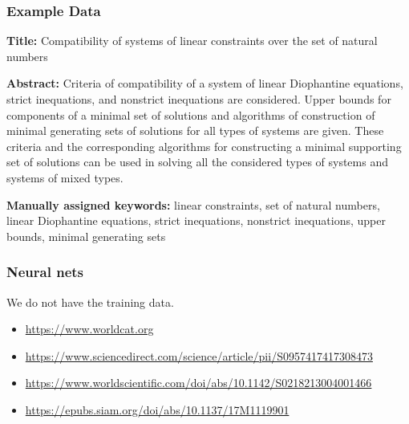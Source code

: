\documentclass{beamer}
\begin{document}
\begin{frame}
\frametitle{Example Data}
\textbf{Title:} Compatibility of systems of linear constraints over the set of natural numbers
\vspace{0.1in}

\textbf{Abstract:} Criteria of compatibility of a system of linear Diophantine equations, strict inequations, and nonstrict inequations are considered. Upper bounds for components of a minimal set of solutions and algorithms of construction of minimal generating sets of solutions for all types of systems are given. These criteria and the corresponding algorithms for constructing a minimal supporting set of solutions can be used in solving all the considered types of systems and systems of mixed types.

\textbf{Manually assigned keywords:}
linear constraints, set of natural numbers, linear Diophantine equations, strict inequations, nonstrict inequations, upper bounds, minimal generating sets
\end{frame}


\begin{frame}
\frametitle{Neural nets}
We do not have the training data. 

\vspace{0.2in}

\begin{itemize}
\item \url{https://www.worldcat.org}

\item \url{https://www.sciencedirect.com/science/article/pii/S0957417417308473}

\item \url{https://www.worldscientific.com/doi/abs/10.1142/S0218213004001466}

\item \url{https://epubs.siam.org/doi/abs/10.1137/17M1119901}
\end{itemize}

\end{frame}
\end{document}
